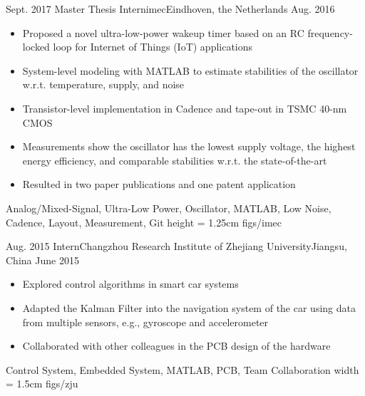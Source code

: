 %
%
%
%
%

\begin{experiences}
	\experience
    {Sept. 2017}	{Master Thesis Intern}{imec}{Eindhoven, the Netherlands}
    {Aug. 2016}	{
    				\begin{itemize}
    					\item Proposed a novel ultra-low-power wakeup timer based on an RC frequency-locked loop for Internet of Things (IoT) applications
              \item System-level modeling with MATLAB to estimate stabilities of the oscillator w.r.t. temperature, supply, and noise
              \item Transistor-level implementation in Cadence and tape-out in TSMC 40-nm CMOS
              \item Measurements show the oscillator has the lowest supply voltage, the highest energy efficiency, and comparable stabilities w.r.t. the state-of-the-art
							\item Resulted in two paper publications and one patent application
    				\end{itemize}
    			}
                {Analog/Mixed-Signal, Ultra-Low Power, Oscillator, MATLAB, Low Noise, Cadence, Layout, Measurement, Git}
     {height = 1.25cm}		{figs/imec}
	\emptySeparator

    \experience
    {Aug. 2015}	{Intern}{Changzhou Research Institute of Zhejiang University}{Jiangsu, China}
    {June 2015}{
    				\begin{itemize}
              \item Explored control algorithms in smart car systems
    					\item Adapted the Kalman Filter into the navigation system of the car using data from multiple sensors, e.g., gyroscope and accelerometer
              \item Collaborated with other colleagues in the PCB design of the hardware
    				\end{itemize}
    			}
                {Control System, Embedded System, MATLAB, PCB, Team Collaboration}
     {width = 1.5cm}		{figs/zju}

\end{experiences}
